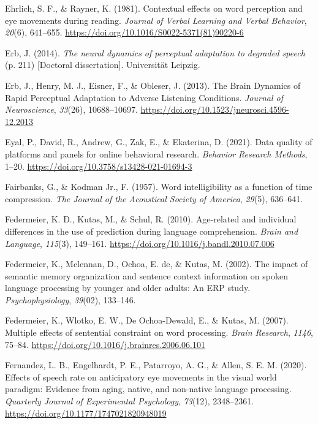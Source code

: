 \documentclass[a4paper, nobind]{templates/ociamthesis}
\newlength{\cslhangindent}
\newenvironment{CSLReferences}[2] %
 {%
  \setlength{\parindent}{0pt}
  \ifodd #1
  \let\oldpar\par
  \def\par{\hangindent=\cslhangindent\oldpar}
  \fi
  \setlength{\parskip}{1mm}
  \setlength{\baselineskip}{6mm}
 }%
 {}
\begin{document}
\begin{CSLReferences}{1}{0}
\leavevmode{}%
Ehrlich, S. F., \& Rayner, K. (1981). {Contextual effects on word perception and eye movements during reading}. \emph{Journal of Verbal Learning and Verbal Behavior}, \emph{20}(6), 641--655. \url{https://doi.org/10.1016/S0022-5371(81)90220-6}

\leavevmode{}%
Erb, J. (2014). \emph{{The neural dynamics of perceptual adaptation to degraded speech}} (p. 211) {[}Doctoral dissertation{]}. Universit{ä}t Leipzig.

\leavevmode{}%
Erb, J., Henry, M. J., Eisner, F., \& Obleser, J. (2013). The Brain Dynamics of Rapid Perceptual Adaptation to Adverse Listening Conditions. \emph{Journal of Neuroscience}, \emph{33}(26), 10688--10697. \url{https://doi.org/10.1523/jneurosci.4596-12.2013}

\leavevmode{}%
Eyal, P., David, R., Andrew, G., Zak, E., \& Ekaterina, D. (2021). {Data quality of platforms and panels for online behavioral research}. \emph{Behavior Research Methods}, 1--20. \url{https://doi.org/10.3758/s13428-021-01694-3}

\leavevmode{}%
Fairbanks, G., \& Kodman Jr., F. (1957). {Word intelligibility as a function of time compression}. \emph{The Journal of the Acoustical Society of America}, \emph{29}(5), 636--641.

\leavevmode{}%
Federmeier, K. D., Kutas, M., \& Schul, R. (2010). {Age-related and individual differences in the use of prediction during language comprehension}. \emph{Brain and Language}, \emph{115}(3), 149--161. \url{https://doi.org/10.1016/j.bandl.2010.07.006}

\leavevmode{}%
Federmeier, K., Mclennan, D., Ochoa, E. de, \& Kutas, M. (2002). {The impact of semantic memory organization and sentence context information on spoken language processing by younger and older adults: An ERP study}. \emph{Psychophysiology}, \emph{39}(02), 133--146.

\leavevmode{}%
Federmeier, K., Wlotko, E. W., De Ochoa-Dewald, E., \& Kutas, M. (2007). Multiple effects of sentential constraint on word processing. \emph{Brain Research}, \emph{1146}, 75--84. \url{https://doi.org/10.1016/j.brainres.2006.06.101}

\leavevmode{}%
Fernandez, L. B., Engelhardt, P. E., Patarroyo, A. G., \& Allen, S. E. M. (2020). {Effects of speech rate on anticipatory eye movements in the visual world paradigm: Evidence from aging, native, and non-native language processing}. \emph{Quarterly Journal of Experimental Psychology}, \emph{73}(12), 2348--2361. \url{https://doi.org/10.1177/1747021820948019}


\end{CSLReferences}
\end{document}
